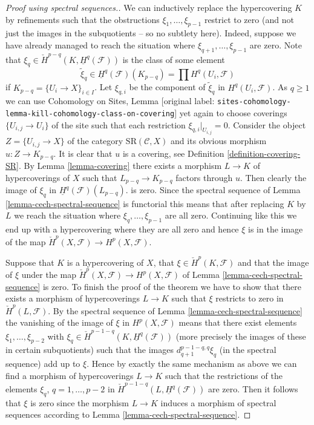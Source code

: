\documentclass[10pt,a4paper]{article}
\theoremstyle{plain}
\theoremstyle{definition}
\theoremstyle{remark}
\numberwithin{equation}{subsection}
\begin{document}
\begin{proof}[Proof using spectral sequences.]
\medskip\noindent
We can inductively replace the hypercovering $K$ by refinements
such that the obstructions $\xi_1, \ldots, \xi_{p - 1}$ restrict to zero
(and not just the images
in the subquotients -- so no subtlety here). Indeed, suppose we have
already managed to reach the situation where
$\xi_{q + 1}, \ldots, \xi_{p - 1}$ are zero.
Note that $\xi_q \in \check{H}^{p - q}(K, \underline{H}^q(\mathcal{F}))$
is the class of some element
$$
\tilde \xi_q \in
\underline{H}^q(\mathcal{F})(K_{p - q}) =
\prod H^q(U_i, \mathcal{F})
$$
if $K_{p - q} = \{U_i \to X\}_{i \in I}$. Let $\xi_{q, i}$
be the component of $\tilde \xi_q$ in $H^q(U_i, \mathcal{F})$.
As $q \geq 1$ we can use
Cohomology on Sites,
Lemma \textnormal{[original label: \nolinkurl{sites-cohomology-lemma-kill-cohomology-class-on-covering}]}
yet again to choose coverings $\{U_{i, j} \to U_i\}$
of the site such that each restriction $\xi_{q, i}|_{U_{i, j}} = 0$.
Consider the object $Z = \{U_{i, j} \to X\}$ of the category
$\text{SR}(\mathcal{C}, X)$ and its obvious morphism
$u : Z \to K_{p - q}$. It is clear that $u$ is a covering, see
Definition \ref{definition-covering-SR}. By
Lemma \ref{lemma-covering} there
exists a morphism $L \to K$ of hypercoverings of $X$ such that
$L_{p - q} \to K_{p - q}$ factors through $u$. Then clearly the
image of $\xi_q$ in $\underline{H}^q(\mathcal{F})(L_{p - q})$.
is zero. Since the spectral sequence of
Lemma \ref{lemma-cech-spectral-sequence}
is functorial this means that after replacing $K$ by $L$ we reach the
situation where $\xi_q, \ldots, \xi_{p - 1}$ are all zero.
Continuing like this we end up with a hypercovering where they are all
zero and hence $\xi$ is in the image of the map
$\check{H}^p(X, \mathcal{F}) \to H^p(X, \mathcal{F})$.

\medskip\noindent
Suppose that $K$ is a hypercovering of $X$, that
$\xi \in \check{H}^p(K, \mathcal{F})$ and that the image of
$\xi$ under the map
$\check{H}^p(X, \mathcal{F}) \to H^p(X, \mathcal{F})$ of
Lemma \ref{lemma-cech-spectral-sequence}
is zero. To finish the proof of the theorem we have to show that
there exists a morphism of hypercoverings $L \to K$ such that
$\xi$ restricts to zero in $\check{H}^p(L, \mathcal{F})$.
By the spectral sequence of Lemma \ref{lemma-cech-spectral-sequence}
the vanishing of the image of $\xi$ in $H^p(X, \mathcal{F})$
means that there exist elements $\xi_1, \ldots, \xi_{p - 2}$
with $\xi_q \in \check{H}^{p - 1 - q}(K, \underline{H}^q(\mathcal{F}))$
(more precisely the images of these in certain subquotients)
such that the images $d_{q + 1}^{p - 1 - q, q}\xi_q$ (in the spectral
sequence) add up to $\xi$. Hence by exactly the same mechanism as above
we can find a morphism of hypercoverings $L \to K$ such that
the restrictions of the elements $\xi_q$, $q = 1, \ldots, p - 2$
in $\check{H}^{p - 1 - q}(L, \underline{H}^q(\mathcal{F}))$ are zero.
Then it follows that $\xi$ is zero since the morphism $L \to K$
induces a morphism of spectral sequences according to
Lemma \ref{lemma-cech-spectral-sequence}.
\end{proof}
\end{document}
